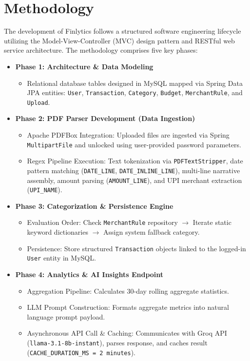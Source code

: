 \documentclass[../Project-Report-Main.tex]{subfiles}
\begin{document}
\pagebreak
\section{Methodology}

The development of Finlytics follows a structured software engineering lifecycle utilizing the Model-View-Controller (MVC) design pattern and RESTful web service architecture. The methodology comprises five key phases:

\begin{itemize}
 \item \textbf{Phase 1: Architecture \& Data Modeling}
 \begin{itemize}
   \item Relational database tables designed in MySQL mapped via Spring Data JPA entities: \texttt{User}, \texttt{Transaction}, \texttt{Category}, \texttt{Budget}, \texttt{MerchantRule}, and \texttt{Upload}.
 \end{itemize}

 \item \textbf{Phase 2: PDF Parser Development (Data Ingestion)}
 \begin{itemize}
   \item Apache PDFBox Integration: Uploaded files are ingested via Spring \texttt{MultipartFile} and unlocked using user-provided password parameters.
   \item Regex Pipeline Execution: Text tokenization via \texttt{PDFTextStripper}, date pattern matching (\texttt{DATE\_LINE}, \texttt{DATE\_INLINE\_LINE}), multi-line narrative assembly, amount parsing (\texttt{AMOUNT\_LINE}), and UPI merchant extraction (\texttt{UPI\_NAME}).
 \end{itemize}

 \item \textbf{Phase 3: Categorization \& Persistence Engine}
 \begin{itemize}
   \item Evaluation Order: Check \texttt{MerchantRule} repository $\rightarrow$ Iterate static keyword dictionaries $\rightarrow$ Assign system fallback category.
   \item Persistence: Store structured \texttt{Transaction} objects linked to the logged-in \texttt{User} entity in MySQL.
 \end{itemize}

 \item \textbf{Phase 4: Analytics \& AI Insights Endpoint}
 \begin{itemize}
   \item Aggregation Pipeline: Calculates 30-day rolling aggregate statistics.
   \item LLM Prompt Construction: Formats aggregate metrics into natural language prompt payload.
   \item Asynchronous API Call \& Caching: Communicates with Groq API (\texttt{llama-3.1-8b-instant}), parses response, and caches result (\texttt{CACHE\_DURATION\_MS = 2 minutes}).
 \end{itemize}


\end{itemize}
\end{document}
